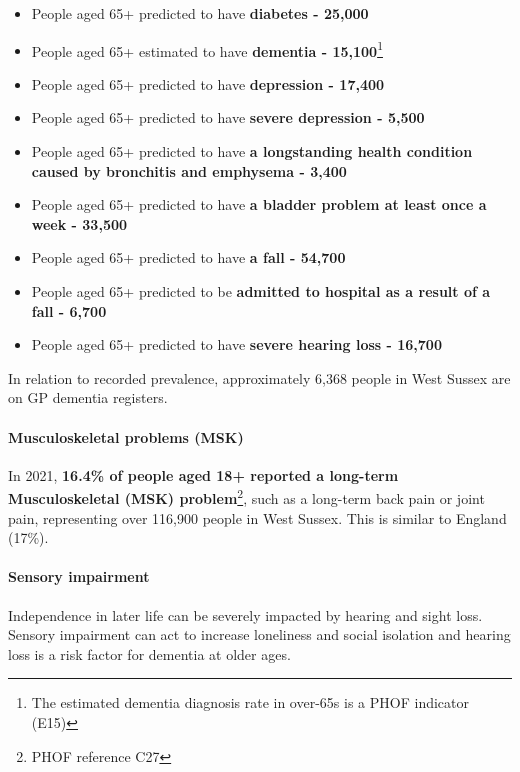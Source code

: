 \begin{itemize}[noitemsep]
    \item People aged 65+ predicted to have {\bfseries diabetes - 25,000}
    \item People aged 65+ estimated to have {\bfseries dementia - 15,100}\footnote{The estimated dementia diagnosis rate in over-65s is a PHOF indicator (E15)}
    \item People aged 65+ predicted to have {\bfseries depression - 17,400}
    \item People aged 65+ predicted to have {\bfseries severe depression - 5,500}
    \item People aged 65+ predicted to have {\bfseries a longstanding health condition caused by bronchitis and emphysema - 3,400}
    \item People aged 65+ predicted to have {\bfseries a bladder problem at least once a week - 33,500}
    \item People aged 65+ predicted to have {\bfseries a fall - 54,700}
    \item People aged 65+ predicted to be {\bfseries admitted to hospital as a result of a fall - 6,700}
    \item People aged 65+ predicted to have {\bfseries severe hearing loss - 16,700}
\end{itemize}

In relation to recorded prevalence, approximately 6,368 people in West Sussex are on GP dementia registers.


\paragraph{Musculoskeletal problems (MSK)} In 2021, {\bfseries 16.4\% of people aged 18+ reported a long-term Musculoskeletal (MSK) problem}\footnote{PHOF reference C27}, such as a long-term back pain or joint pain, representing over 116,900 people in West Sussex. This is similar to England (17\%).

\paragraph{Sensory impairment} Independence in later life can be severely impacted by hearing and sight loss. Sensory impairment can act to increase loneliness and social isolation and hearing loss is a risk factor for dementia at older ages.

